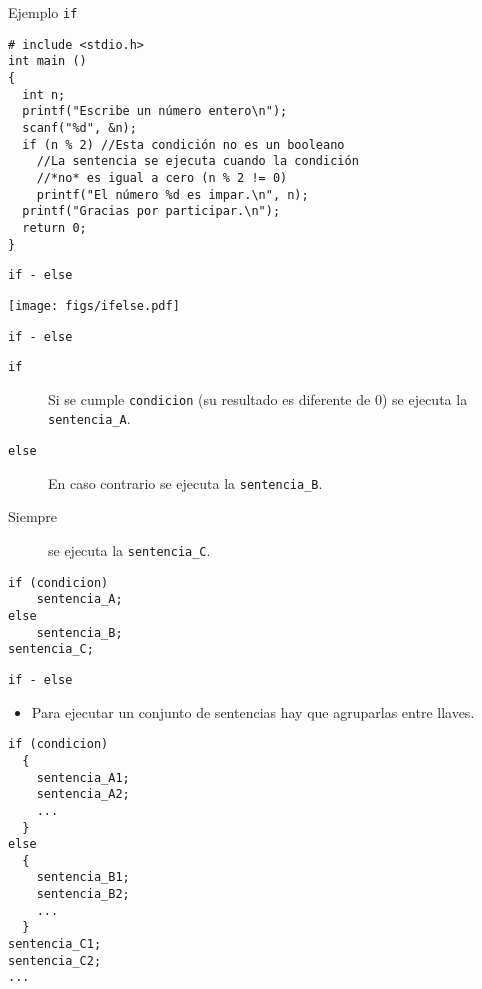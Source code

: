 \documentclass[xcolor={usenames,svgnames,dvipsnames}, aspectratio=169]{beamer}
\begin{document}
\begin{frame}[label={sec:org66c4097},fragile]{Ejemplo \texttt{if}}
 \lstset{language=C,label= ,caption= ,captionpos=b,numbers=none}
\begin{lstlisting}
# include <stdio.h>
int main ()
{
  int n;
  printf("Escribe un número entero\n");
  scanf("%d", &n);
  if (n % 2) //Esta condición no es un booleano
    //La sentencia se ejecuta cuando la condición
    //*no* es igual a cero (n % 2 != 0)
    printf("El número %d es impar.\n", n);
  printf("Gracias por participar.\n");
  return 0;
}
\end{lstlisting}
\end{frame}



\begin{frame}[label={sec:orge9b56a6},fragile]{\texttt{if - else}}
 \begin{center}
\texttt{[image: figs/ifelse.pdf]}
\end{center}
\end{frame}


\begin{frame}[label={sec:orgede5ee1},fragile]{\texttt{if - else}}
 \begin{description}
\item[{\texttt{if}}] Si se cumple \texttt{condicion} (su resultado es \alert{diferente de 0}) se ejecuta la \texttt{sentencia\_A}.
\item[{\texttt{else}}] En caso contrario se ejecuta la \texttt{sentencia\_B}.
\item[{Siempre}] se ejecuta la \texttt{sentencia\_C}.
\end{description}
\lstset{language=C,label= ,caption= ,captionpos=b,numbers=none}
\begin{lstlisting}
if (condicion)
    sentencia_A;
else
    sentencia_B;
sentencia_C;
\end{lstlisting}
\end{frame}
\begin{frame}[label={sec:org9080e3f},fragile]{\texttt{if - else}}
 \begin{itemize}
\item Para ejecutar un conjunto de sentencias hay que agruparlas \alert{entre llaves}.
\end{itemize}
\lstset{language=C,label= ,caption= ,captionpos=b,numbers=none}
\begin{lstlisting}
if (condicion)
  {
    sentencia_A1;
    sentencia_A2;
    ...
  }
else
  {
    sentencia_B1;
    sentencia_B2;
    ...    
  }
sentencia_C1;
sentencia_C2;
...
\end{lstlisting}
\end{frame}
\end{document}
